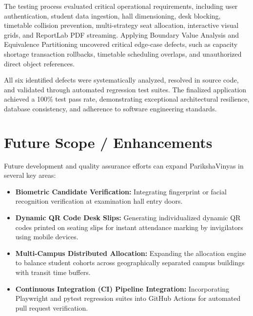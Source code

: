 \documentclass{InternshipReport}
\begin{document}
The testing process evaluated critical operational requirements, including user authentication, student data ingestion, hall dimensioning, desk blocking, timetable collision prevention, multi-strategy seat allocation, interactive visual grids, and ReportLab PDF streaming. Applying Boundary Value Analysis and Equivalence Partitioning uncovered critical edge-case defects, such as capacity shortage transaction rollbacks, timetable scheduling overlaps, and unauthorized direct object references.

All six identified defects were systematically analyzed, resolved in source code, and validated through automated regression test suites. The finalized application achieved a 100\% test pass rate, demonstrating exceptional architectural resilience, database consistency, and adherence to software engineering standards.

\section{Future Scope / Enhancements}
Future development and quality assurance efforts can expand ParikshaVinyas in several key areas:
\begin{itemize}
    \item \textbf{Biometric Candidate Verification:} Integrating fingerprint or facial recognition verification at examination hall entry doors.
    \item \textbf{Dynamic QR Code Desk Slips:} Generating individualized dynamic QR codes printed on seating slips for instant attendance marking by invigilators using mobile devices.
    \item \textbf{Multi-Campus Distributed Allocation:} Expanding the allocation engine to balance student cohorts across geographically separated campus buildings with transit time buffers.
    \item \textbf{Continuous Integration (CI) Pipeline Integration:} Incorporating Playwright and pytest regression suites into GitHub Actions for automated pull request verification.
\end{itemize}
\end{document}
